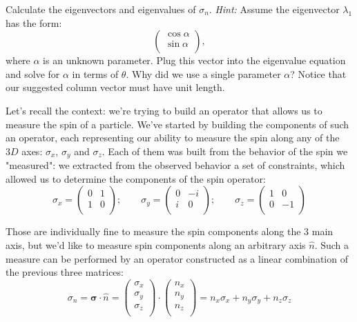 \documentclass[solutions.tex]{subfiles}
\begin{document}
\maketitle
\begin{exercise}
Calculate the eigenvectors and eigenvalues of $\sigma_n$. \textit{Hint:}
Assume the eigenvector $\lambda_1$ has the form:
\[
	\begin{pmatrix}
		\cos\alpha \\
		\sin\alpha \\
	\end{pmatrix},
\]
where $\alpha$ is an unknown parameter. Plug this vector into the eigenvalue
equation and solve for $\alpha$ in terms of $\theta$. Why did we use a single
parameter $\alpha$? Notice that our suggested column vector must have unit
length.
\end{exercise}
Let's recall the context: we're trying to build an operator that allows
us to measure the spin of a particle. We've started by building the
components of such an operator, each representing our ability to measure
the spin along any of the $3D$ axes: $\sigma_x$, $\sigma_y$ and $\sigma_z$.
Each of them was built from the behavior of the spin we "measured": we
extracted from the observed behavior a set of constraints, which allowed
us to determine the components of the spin operator: \\

\[
	\sigma_x = \begin{pmatrix}
		0 & 1 \\
		1 & 0 \\
	\end{pmatrix};\qquad \sigma_y = \begin{pmatrix}
		0 & -i \\
		i & 0 \\
	\end{pmatrix};\qquad \sigma_z = \begin{pmatrix}
		1 & 0 \\
		0 & -1 \\
	\end{pmatrix}
\]

Those are individually fine to measure the spin components
along the $3$ main axis, but we'd like to measure spin components
along an arbitrary axis $\hat{n}$. Such a measure can be performed
by an operator constructed as a linear combination of the previous
three matrices:
\[
	\sigma_n = \bm{\sigma} \cdot \hat{n} = \begin{pmatrix}
		\sigma_x \\
		\sigma_y \\
		\sigma_z \\
	\end{pmatrix} \cdot \begin{pmatrix}
		n_x \\
		n_y \\
		n_z \\
	\end{pmatrix}
	= n_x\sigma_x + n_y\sigma_y + n_z\sigma_z
\]
\end{document}
